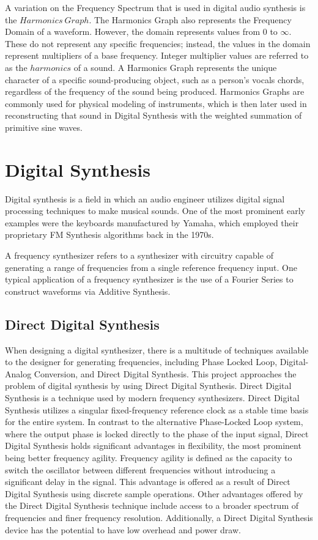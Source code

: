 \documentclass[a4paper,12pt]{report}
\begin{document}
A variation on the Frequency Spectrum that is used in digital audio synthesis is the $Harmonics\ Graph$. The Harmonics Graph also represents the Frequency Domain of a waveform. However, the domain represents values from 0 to $\infty$. These do not represent any specific frequencies; instead, the values in the domain represent multipliers of a base frequency. Integer multiplier values are referred to as the $harmonics$ of a sound. A Harmonics Graph represents the unique character of a specific sound-producing object, such as a person's vocals chords, regardless of the frequency of the sound being produced. Harmonics Graphs are commonly used for physical modeling of instruments, which is then later used in reconstructing that sound in Digital Synthesis with the weighted summation of primitive sine waves.


\section{Digital Synthesis}
\label{subsec:digitalsynth}
Digital synthesis is a field in which an audio engineer utilizes digital signal processing techniques to make musical sounds. One of the most prominent early examples were the keyboards manufactured by Yamaha, which employed their proprietary FM Synthesis algorithms back in the 1970s.

A frequency synthesizer refers to a synthesizer with circuitry capable of generating a range of frequencies from a single reference frequency input. One typical application of a frequency synthesizer is the use of a Fourier Series to construct waveforms via Additive Synthesis.

\subsection{Direct Digital Synthesis}
\label{subsec:directdigitalsynth}
When designing a digital synthesizer, there is a multitude of techniques available to the designer for generating frequencies, including Phase Locked Loop, Digital-Analog Conversion, and Direct Digital Synthesis. This project approaches the problem of digital synthesis by using Direct Digital Synthesis. Direct Digital Synthesis is a technique used by modern frequency synthesizers. Direct Digital Synthesis utilizes a singular fixed-frequency reference clock as a stable time basis for the entire system. In contrast to the alternative Phase-Locked Loop system, where the output phase is locked directly to the phase of the input signal, Direct Digital Synthesis holds significant advantages in flexibility, the most prominent being better frequency agility. Frequency agility is defined as the capacity to switch the oscillator between different frequencies without introducing a significant delay in the signal. This advantage is offered as a result of Direct Digital Synthesis using discrete sample operations. Other advantages offered by the Direct Digital Synthesis technique include access to a broader spectrum of frequencies and finer frequency resolution. Additionally, a Direct Digital Synthesis device has the potential to have low overhead and power draw.
\end{document}

